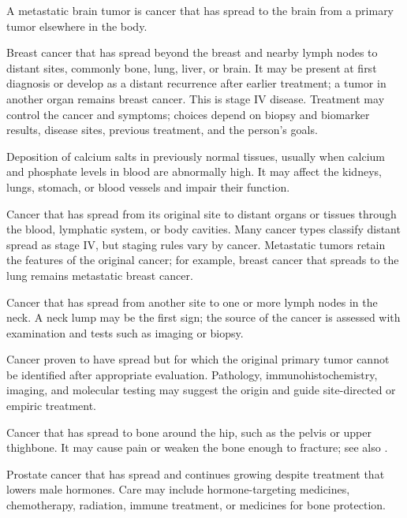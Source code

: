  A metastatic brain tumor is cancer that has spread to the brain from a primary tumor elsewhere in the body.

 Breast cancer that has spread beyond the breast and
nearby lymph nodes to distant sites, commonly bone, lung, liver, or brain. It may be
present at first diagnosis or develop as a distant recurrence after earlier treatment;
a tumor in another organ remains breast cancer. This is stage IV disease. Treatment may
control the cancer and symptoms; choices depend on biopsy and biomarker results, disease
sites, previous treatment, and the person's goals.

 Deposition of calcium salts in previously normal tissues, usually when calcium and phosphate levels in blood are abnormally high. It may affect the kidneys, lungs, stomach, or blood vessels and impair their function.

 Cancer that has spread from its original site to distant organs or tissues through the blood, lymphatic system, or body cavities. Many cancer types classify distant spread as stage IV, but staging rules vary by cancer. Metastatic tumors retain the features of the original cancer; for example, breast cancer that spreads to the lung remains metastatic breast cancer.

 Cancer that has spread from another site to one or more lymph nodes in the neck. A neck lump may be the first sign; the source of the cancer is assessed with examination and tests such as imaging or biopsy.

 Cancer proven to have spread but for which the original primary tumor cannot be identified after appropriate evaluation. Pathology, immunohistochemistry, imaging, and molecular testing may suggest the origin and guide site-directed or empiric treatment.

 Cancer that has spread to bone around the hip, such as the pelvis or upper thighbone. It may cause pain or weaken the bone enough to fracture; see also .

 Prostate cancer that has spread and continues growing despite treatment that lowers male hormones. Care may include hormone-targeting medicines, chemotherapy, radiation, immune treatment, or medicines for bone protection.

